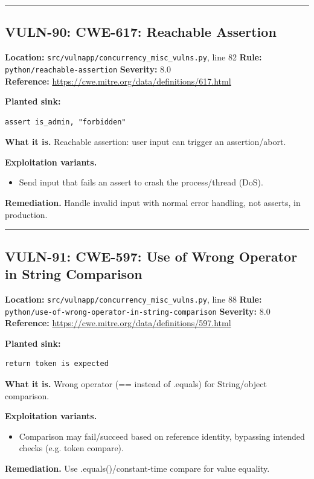 \documentclass[11pt,a4paper]{article}
\begin{document}
\vspace{4pt}\hrule\vspace{6pt}
\subsection{VULN-90: CWE-617: Reachable Assertion}
\noindent\textbf{Location:} \texttt{src/vulnapp/concurrency\_misc\_vulns.py}, line 82 \quad \textbf{Rule:} \texttt{python/reachable-assertion} \quad \textbf{Severity:} 8.0
\\ \textbf{Reference:} \url{https://cwe.mitre.org/data/definitions/617.html}

\noindent\textbf{Planted sink:}
\begin{lstlisting}
assert is_admin, "forbidden"
\end{lstlisting}
\noindent\textbf{What it is.} Reachable assertion: user input can trigger an assertion/abort.

\noindent\textbf{Exploitation variants.}
\begin{itemize}[leftmargin=1.4em,itemsep=1pt,topsep=2pt]
\item Send input that fails an assert to crash the process/thread (DoS).
\end{itemize}
\noindent\textbf{Remediation.} Handle invalid input with normal error handling, not asserts, in production.

\vspace{4pt}\hrule\vspace{6pt}
\subsection{VULN-91: CWE-597: Use of Wrong Operator in String Comparison}
\noindent\textbf{Location:} \texttt{src/vulnapp/concurrency\_misc\_vulns.py}, line 88 \quad \textbf{Rule:} \texttt{python/use-of-wrong-operator-in-string-comparison} \quad \textbf{Severity:} 8.0
\\ \textbf{Reference:} \url{https://cwe.mitre.org/data/definitions/597.html}

\noindent\textbf{Planted sink:}
\begin{lstlisting}
return token is expected
\end{lstlisting}
\noindent\textbf{What it is.} Wrong operator (== instead of .equals) for String/object comparison.

\noindent\textbf{Exploitation variants.}
\begin{itemize}[leftmargin=1.4em,itemsep=1pt,topsep=2pt]
\item Comparison may fail/succeed based on reference identity, bypassing intended checks (e.g. token compare).
\end{itemize}
\noindent\textbf{Remediation.} Use .equals()/constant-time compare for value equality.
\end{document}
